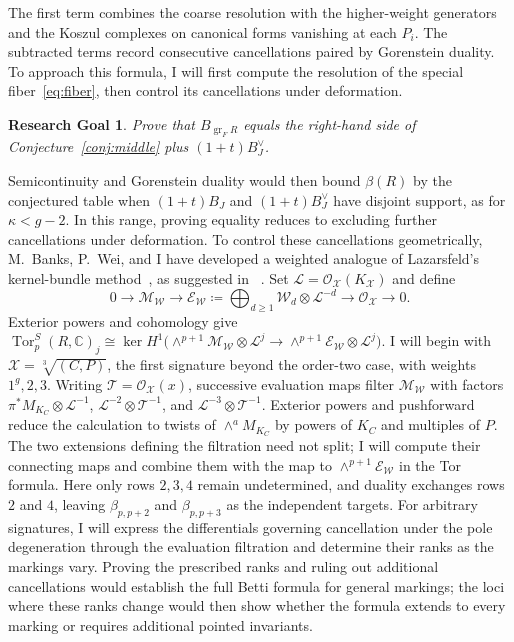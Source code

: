 \documentclass[11pt,reqno]{amsart}
\newtheorem{goal}[lemma]{Research Goal}
\theoremstyle{remark}
\newcommand{\Tor}{\operatorname{Tor}}
\newcommand{\CC}{\mathbb{C}}
\newcommand{\cE}{\mathcal{E}}
\newcommand{\cL}{\mathcal{L}}
\newcommand{\cM}{\mathcal{M}}
\newcommand{\cO}{\mathcal{O}}
\newcommand{\cT}{\mathcal{T}}
\newcommand{\cW}{\mathcal{W}}
\newcommand{\cX}{\mathcal{X}}
\begin{document}
The first term combines the coarse resolution with the higher-weight generators and the Koszul complexes on canonical forms vanishing at each $P_i$. The subtracted terms record consecutive cancellations paired by Gorenstein duality. To approach this formula, I will first compute the resolution of the special fiber~\eqref{eq:fiber}, then control its cancellations
under deformation.

\begin{goal}\label{goal:special-fiber}
Prove that $B_{\operatorname{gr}_F R}$ equals the right-hand side of Conjecture~\ref{conj:middle} plus $(1+t)B_J^\vee$.
\end{goal}

Semicontinuity and Gorenstein duality would then bound $\beta(R)$ by the conjectured table when $(1+t)B_J$ and $(1+t)B_J^\vee$ have disjoint support, as for $\kappa<g-2$. In this range, proving equality reduces to excluding further cancellations under deformation. To control these cancellations geometrically, M.~Banks, P.~Wei, and I have developed a weighted analogue of Lazarsfeld's kernel-bundle method~\cite{lazarsfeld89,greenLazarsfeld88}, as suggested in~\cite[\S7.3]{brownErman25}
. Set $\cL=\cO_{\cX}(K_{\cX})$ and define
\[
0\longrightarrow\cM_{\cW}\longrightarrow
\cE_{\cW}\coloneqq\bigoplus_{d\geq1}\cW_d\otimes\cL^{-d}
\longrightarrow\cO_{\cX}\longrightarrow0.
\]
Exterior powers and cohomology give
$\Tor_p^S(R,\CC)_j\cong
\ker H^1\!\bigl(
\wedge^{p+1}\cM_{\cW}\otimes\cL^j
\to
\wedge^{p+1}\cE_{\cW}\otimes\cL^j
\bigr)$. I will begin with $\cX=\sqrt[3]{(C,P)}$, the first signature beyond the order-two case, with weights $1^g,2,3$. Writing $\cT=\cO_{\cX}(x)$, successive evaluation maps filter $\cM_{\cW}$ with factors $\pi^*M_{K_C}\otimes\cL^{-1}$, $\cL^{-2}\otimes\cT^{-1}$, and $\cL^{-3}\otimes\cT^{-1}$. Exterior powers and pushforward reduce the calculation to twists of $\wedge^aM_{K_C}$ by powers of $K_C$ and multiples of $P$. The two extensions defining the filtration need not split; I will compute their connecting maps and combine them with the map to $\wedge^{p+1}\cE_{\cW}$ in the Tor formula. Here only rows $2,3,4$ remain undetermined, and duality exchanges rows $2$ and $4$, leaving $\beta_{p,p+2}$ and $\beta_{p,p+3}$ as the independent targets. For arbitrary signatures, I will express the differentials governing cancellation under the pole degeneration through the evaluation filtration and determine their ranks as the markings vary. Proving the prescribed ranks and ruling out additional cancellations would establish the full Betti formula for general markings; the loci where these ranks change would then show whether the formula extends to every marking or requires additional pointed invariants.
\end{document}
